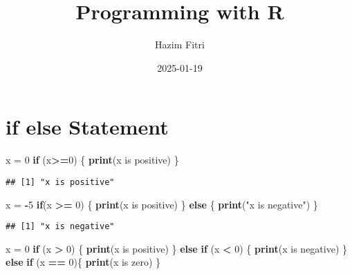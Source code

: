 \documentclass[
]{article}
\title{Programming with R}
\author{Hazim Fitri}
\date{2025-01-19}
\newenvironment{Shaded}{\begin{snugshade}}{\end{snugshade}}
\newcommand{\ControlFlowTok}[1]{\textcolor[rgb]{0.13,0.29,0.53}{\textbf{#1}}}
\newcommand{\DecValTok}[1]{\textcolor[rgb]{0.00,0.00,0.81}{#1}}
\newcommand{\FunctionTok}[1]{\textcolor[rgb]{0.13,0.29,0.53}{\textbf{#1}}}
\newcommand{\NormalTok}[1]{#1}
\newcommand{\OtherTok}[1]{\textcolor[rgb]{0.56,0.35,0.01}{#1}}
\newcommand{\SpecialCharTok}[1]{\textcolor[rgb]{0.81,0.36,0.00}{\textbf{#1}}}
\newcommand{\StringTok}[1]{\textcolor[rgb]{0.31,0.60,0.02}{#1}}
\begin{document}
\maketitle

{
\setcounter{tocdepth}{6}
\tableofcontents
}
\section{if else Statement}\label{if-else-statement}

\begin{Shaded}
\begin{Highlighting}[]
\NormalTok{x }\OtherTok{=} \DecValTok{0}
\ControlFlowTok{if}\NormalTok{ (x}\SpecialCharTok{\textgreater{}=}\DecValTok{0}\NormalTok{) \{}
  \FunctionTok{print}\NormalTok{(}\StringTok{\textquotesingle{}x is positive\textquotesingle{}}\NormalTok{)}
\NormalTok{\}}
\end{Highlighting}
\end{Shaded}

\begin{verbatim}
## [1] "x is positive"
\end{verbatim}

\begin{Shaded}
\begin{Highlighting}[]
\NormalTok{x }\OtherTok{=} \SpecialCharTok{{-}}\DecValTok{5}
\ControlFlowTok{if}\NormalTok{(x }\SpecialCharTok{\textgreater{}=} \DecValTok{0}\NormalTok{) \{}
  \FunctionTok{print}\NormalTok{(}\StringTok{\textquotesingle{}x is positive\textquotesingle{}}\NormalTok{)}
\NormalTok{\} }\ControlFlowTok{else}\NormalTok{ \{}
  \FunctionTok{print}\NormalTok{(}\StringTok{"x is negative"}\NormalTok{)}
\NormalTok{\}}
\end{Highlighting}
\end{Shaded}

\begin{verbatim}
## [1] "x is negative"
\end{verbatim}

\begin{Shaded}
\begin{Highlighting}[]
\NormalTok{x }\OtherTok{=} \DecValTok{0}
\ControlFlowTok{if}\NormalTok{ (x }\SpecialCharTok{\textgreater{}} \DecValTok{0}\NormalTok{) \{}
  \FunctionTok{print}\NormalTok{(}\StringTok{\textquotesingle{}x is positive\textquotesingle{}}\NormalTok{)}
\NormalTok{\} }\ControlFlowTok{else} \ControlFlowTok{if}\NormalTok{ (x }\SpecialCharTok{\textless{}} \DecValTok{0}\NormalTok{) \{}
  \FunctionTok{print}\NormalTok{(}\StringTok{\textquotesingle{}x is negative\textquotesingle{}}\NormalTok{)}
\NormalTok{\} }\ControlFlowTok{else} \ControlFlowTok{if}\NormalTok{ (x }\SpecialCharTok{==} \DecValTok{0}\NormalTok{)\{}
  \FunctionTok{print}\NormalTok{(}\StringTok{\textquotesingle{}x is zero\textquotesingle{}}\NormalTok{)}
\NormalTok{\}}
\end{Highlighting}
\end{Shaded}
\end{document}
